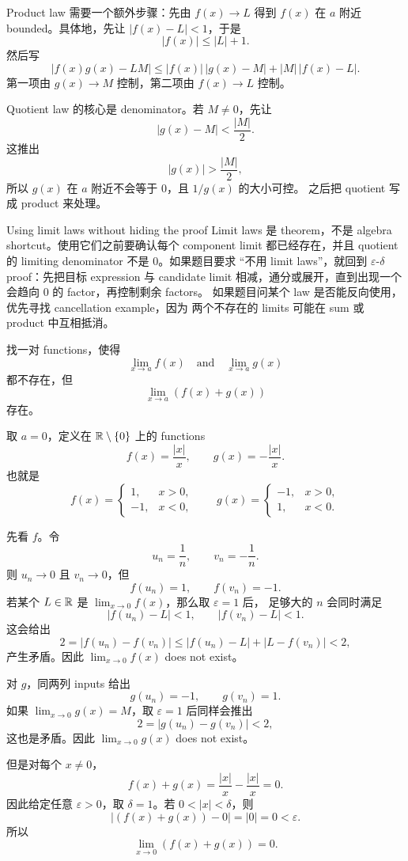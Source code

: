 Product law 需要一个额外步骤：先由 \(f(x)\to L\) 得到 \(f(x)\) 在 \(a\)
附近 bounded。具体地，先让 \(|f(x)-L|<1\)，于是
\[
  |f(x)|\leq |L|+1.
\]
然后写
\[
  |f(x)g(x)-LM|
  \leq
  |f(x)|\,|g(x)-M|+|M|\,|f(x)-L|.
\]
第一项由 \(g(x)\to M\) 控制，第二项由 \(f(x)\to L\) 控制。

Quotient law 的核心是 denominator。若 \(M\neq0\)，先让
\[
  |g(x)-M|<\frac{|M|}{2}.
\]
这推出
\[
  |g(x)|>\frac{|M|}{2},
\]
所以 \(g(x)\) 在 \(a\) 附近不会等于 \(0\)，且 \(1/g(x)\) 的大小可控。
之后把 quotient 写成 product 来处理。

\begin{reviewbox}{Using limit laws without hiding the proof}
Limit laws 是 theorem，不是 algebra shortcut。使用它们之前要确认每个
component limit 都已经存在，并且 quotient 的 limiting denominator
不是 \(0\)。如果题目要求 ``不用 limit laws''，就回到
\(\varepsilon\)-\(\delta\) proof：先把目标 expression 与 candidate limit
相减，通分或展开，直到出现一个会趋向 \(0\) 的 factor，再控制剩余 factors。
如果题目问某个 law 是否能反向使用，优先寻找 cancellation example，因为
两个不存在的 limits 可能在 sum 或 product 中互相抵消。
\end{reviewbox}

\begin{exerciseblock}
找一对 functions，使得
\[
  \lim_{x\to a}f(x)
  \quad\text{and}\quad
  \lim_{x\to a}g(x)
\]
都不存在，但
\[
  \lim_{x\to a}(f(x)+g(x))
\]
存在。
\end{exerciseblock}

\begin{solution}
取 \(a=0\)，定义在 \(\mathbb{R}\setminus\{0\}\) 上的 functions
\[
  f(x)=\frac{|x|}{x},
  \qquad
  g(x)=-\frac{|x|}{x}.
\]
也就是
\[
  f(x)=
  \begin{cases}
    1, & x>0,\\
    -1, & x<0,
  \end{cases}
  \qquad
  g(x)=
  \begin{cases}
    -1, & x>0,\\
    1, & x<0.
  \end{cases}
\]

先看 \(f\)。令
\[
  u_n=\frac1n,\qquad v_n=-\frac1n.
\]
则 \(u_n\to0\) 且 \(v_n\to0\)，但
\[
  f(u_n)=1,\qquad f(v_n)=-1.
\]
若某个 \(L\in\mathbb{R}\) 是 \(\lim_{x\to0}f(x)\)，那么取 \(\varepsilon=1\) 后，
足够大的 \(n\) 会同时满足
\[
  |f(u_n)-L|<1,\qquad |f(v_n)-L|<1.
\]
这会给出
\[
  2=|f(u_n)-f(v_n)|
  \leq
  |f(u_n)-L|+|L-f(v_n)|
  <
  2,
\]
产生矛盾。因此 \(\lim_{x\to0}f(x)\) does not exist。

对 \(g\)，同两列 inputs 给出
\[
  g(u_n)=-1,\qquad g(v_n)=1.
\]
如果 \(\lim_{x\to0}g(x)=M\)，取 \(\varepsilon=1\) 后同样会推出
\[
  2=|g(u_n)-g(v_n)|<2,
\]
这也是矛盾。因此 \(\lim_{x\to0}g(x)\) does not exist。

但是对每个 \(x\neq0\)，
\[
  f(x)+g(x)=\frac{|x|}{x}-\frac{|x|}{x}=0.
\]
因此给定任意 \(\varepsilon>0\)，取 \(\delta=1\)。若
\(0<|x|<\delta\)，则
\[
  |(f(x)+g(x))-0|=|0|=0<\varepsilon.
\]
所以
\[
  \lim_{x\to0}(f(x)+g(x))=0.
\]
\end{solution}

